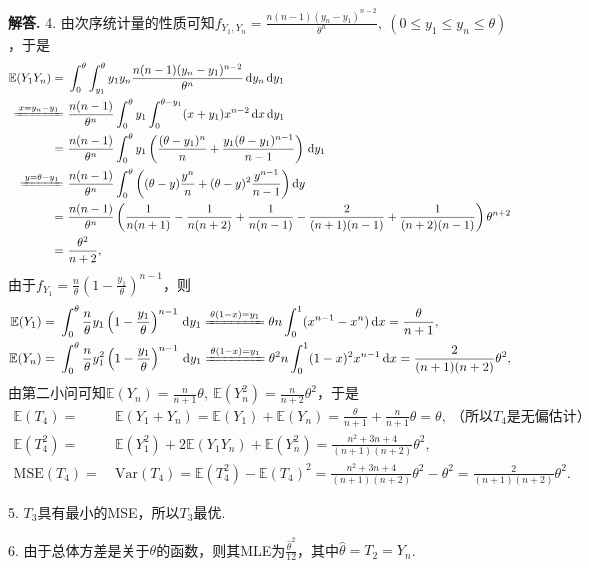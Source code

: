 \documentclass[12pt, a4paper, oneside]{ctexart}
\newenvironment{solution}[1][]{\par\noindent\textbf{#1解答. }}{\smallskip\par}  %
\let\leq=\leqslant %
\def\E{\mathbb{E}}          %
\def\var{\text{Var}}        %
\def\d{\mathrm{d}}          %
\begin{document}
\begin{solution}
    4. 由次序统计量的性质可知$f_{Y_1,Y_n} = \frac{n(n-1)(y_n-y_1)^{n-2}}{\theta^n},\ (0\leq y_1\leq y_n\leq \theta)$，于是
    \begin{align*}
        \E(Y_1Y_n)=&\ \int_0^\theta\int_{y_1}^\theta y_1y_n\frac{n(n-1)(y_n-y_1)^{n-2}}{\theta^n}\,\d y_n\,\d y_1\\
        \xlongequal{x=y_n-y_1}&\ \frac{n(n-1)}{\theta^n}\int_0^\theta y_1\int_0^{\theta-y_1}(x+y_1)x^{n-2}\,\d x\,\d y_1\\
        =&\ \frac{n(n-1)}{\theta^n}\int_0^\theta y_1\left(\frac{(\theta-y_1)^n}{n}+\frac{y_1(\theta-y_1)^{n-1}}{n-1}\right)\,\d y_1\\
        \xlongequal{y=\theta-y_1}&\ \frac{n(n-1)}{\theta^n}\int_0^\theta\left((\theta-y)\frac{y^n}{n}+(\theta-y)^2\frac{y^{n-1}}{n-1}\right)\d y\\
        =&\ \frac{n(n-1)}{\theta^n}\left(\frac{1}{n(n+1)}-\frac{1}{n(n+2)}+\frac{1}{n(n-1)}-\frac{2}{(n+1)(n-1)}+\frac{1}{(n+2)(n-1)}\right)\theta^{n+2}\\
        =&\ \frac{\theta^2}{n+2},
    \end{align*}
    由于$f_{Y_1} = \frac{n}{\theta}(1-\frac{y_1}{\theta})^{n-1}$，则
    \begin{align*}
        \E(Y_1) =&\ \int_0^{\theta}\frac{n}{\theta}y_1\left(1-\frac{y_1}{\theta}\right)^{n-1}\,\d y_1
        \xlongequal{\theta(1-x)=y_1} \theta n\int_0^{1}(x^{n-1}-x^n)\,\d x
        = \frac{\theta}{n+1},\\
        \E(Y_n) =&\ \int_0^\theta\frac{n}{\theta}y_1^2\left(1-\frac{y_1}{\theta}\right)^{n-1}\,\d y_1
        \xlongequal{\theta(1-x) = y_1} \theta^2n\int_0^1(1-x)^2x^{n-1}\,\d x
        = \frac{2}{(n+1)(n+2)}\theta^2,
    \end{align*}
    由第二小问可知$\E(Y_n) = \frac{n}{n+1}\theta,\ \E(Y_n^2) = \frac{n}{n+2}\theta^2$，于是
    \begin{align*}
        \E(T_4)=&\ \E(Y_1+Y_n) = \E(Y_1)+\E(Y_n) = \frac{\theta}{n+1}+\frac{n}{n+1}\theta = \theta,\ \text{（所以}T_4\text{是无偏估计）}\\
        \E(T_4^2) =&\ \E(Y_1^2)+2\E(Y_1Y_n)+\E(Y_n^2) = \frac{n^2+3n+4}{(n+1)(n+2)}\theta^2,\\
        \text{MSE}(T_4) =&\ \var(T_4) = \E(T_4^2)-\E(T_4)^2 = \frac{n^2+3n+4}{(n+1)(n+2)}\theta^2-\theta^2 = \frac{2}{(n+1)(n+2)}\theta^2.
    \end{align*}

    5. $T_3$具有最小的MSE，所以$T_3$最优.

    6. 由于总体方差是关于$\theta$的函数，则其MLE为$\frac{\hat{\theta}^2}{12}$，其中$\hat{\theta}=T_2=Y_n$.
\end{solution}
\end{document}
